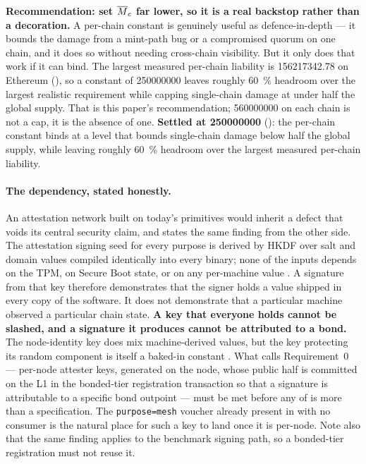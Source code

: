\begin{remark}
\textbf{Recommendation: set $\overline{M}_{c}$ far lower, so it is a real backstop rather than a decoration.}
A per-chain constant is genuinely useful as defence-in-depth --- it bounds the damage from a mint-path
bug or a compromised quorum on one chain, and it does so without needing cross-chain visibility. But
it only does that work if it can bind. The largest measured per-chain liability is
\num{156217342.78}\flux{} on Ethereum (), so a constant of
\num{250000000}\flux{} leaves roughly \SI{60}{\percent} headroom over the largest realistic
requirement while capping single-chain damage at under half the global supply. That is this paper's
recommendation; \num{560000000} on each chain is not a cap, it is the absence of one.
\textbf{Settled at \num{250000000}\flux{}} 
(\planned): the per-chain constant binds at a level that bounds single-chain damage below half the
global supply, while leaving roughly \SI{60}{\percent} headroom over the largest measured per-chain
liability.
\end{remark}

\paragraph{The dependency, stated honestly.} An attestation network built on today's primitives
would inherit a defect that voids its central security claim, and 
states the same finding from the other side. The \fluxsas attestation signing seed for every purpose
is derived by HKDF over salt and domain values compiled identically into every binary; none of the
inputs depends on the TPM, on Secure Boot state, or on any per-machine value
. A signature from that key therefore
demonstrates that the signer holds a value shipped in every copy of the software. It does not
demonstrate that a particular machine observed a particular chain state. \textbf{A key that everyone
holds cannot be slashed, and a signature it produces cannot be attributed to a bond.} The
node-identity key does mix machine-derived values, but the key protecting its random component is
itself a baked-in constant . What
 calls Requirement~0 --- per-node attester keys, generated on the node,
whose public half is committed on the L1 in the bonded-tier registration transaction so that a
signature is attributable to a specific bond outpoint --- must be met before any of
 is more than a specification. The \texttt{purpose=\allowbreak{}mesh} voucher
already present in \fluxsas with no consumer  is the
natural place for such a key to land once it is per-node. Note also that the same finding applies to
the benchmark signing path, so a bonded-tier registration must not reuse it.

